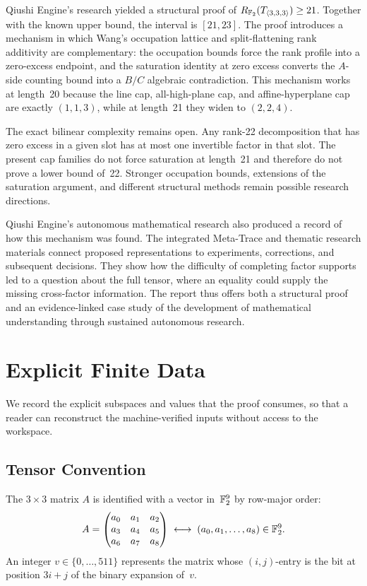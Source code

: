 \documentclass[11pt,a4paper]{article}
\begin{document}
Qiushi Engine's research yielded a structural proof of
$R_{\mathbb{F}_2}(T_{\langle3,3,3\rangle})\ge21$.
Together with the known upper bound, the interval is $[21,23]$.  The proof introduces a mechanism in which Wang's occupation lattice and split-flattening rank additivity are complementary: the occupation bounds force the rank profile into a zero-excess endpoint, and the saturation identity at zero excess converts the $A$-side counting bound into a $B/C$ algebraic contradiction.  This mechanism works at length~20 because the line cap, all-high-plane cap, and affine-hyperplane cap are exactly $(1,1,3)$, while at length~21 they widen to $(2,2,4)$.

The exact bilinear complexity remains open. Any rank-22 decomposition that has zero excess in a given slot has at most one invertible factor in that slot. The present cap families do not force saturation at length~21 and therefore do not prove a lower bound of~22. Stronger occupation bounds, extensions of the saturation argument, and different structural methods remain possible research directions.

Qiushi Engine's autonomous mathematical research also produced a record of how
this mechanism was found. The integrated Meta-Trace and thematic research
materials connect proposed representations to experiments, corrections,
and subsequent decisions. They show how the difficulty of completing
factor supports led to a question about the full tensor, where an equality
could supply the missing cross-factor information. The report thus offers
both a structural proof and an evidence-linked case study of the
development of mathematical understanding through sustained autonomous
research.

\bigskip
\appendix
\section{Explicit Finite Data}\label{app:data}

We record the explicit subspaces and values that the proof consumes, so that a reader can reconstruct the machine-verified inputs without access to the workspace.

\subsection{Tensor Convention}

The $3\times 3$ matrix $A$ is identified with a vector in~$\mathbb{F}_2^9$ by row-major order:
\[
  A = \begin{pmatrix} a_0 & a_1 & a_2 \\ a_3 & a_4 & a_5 \\ a_6 & a_7 & a_8 \end{pmatrix}
  \;\longleftrightarrow\; (a_0,a_1,\ldots,a_8)\in\mathbb{F}_2^9.
\]
An integer $v\in\{0,\ldots,511\}$ represents the matrix whose $(i,j)$-entry is the bit at position $3i+j$ of the binary expansion of~$v$.
\end{document}
